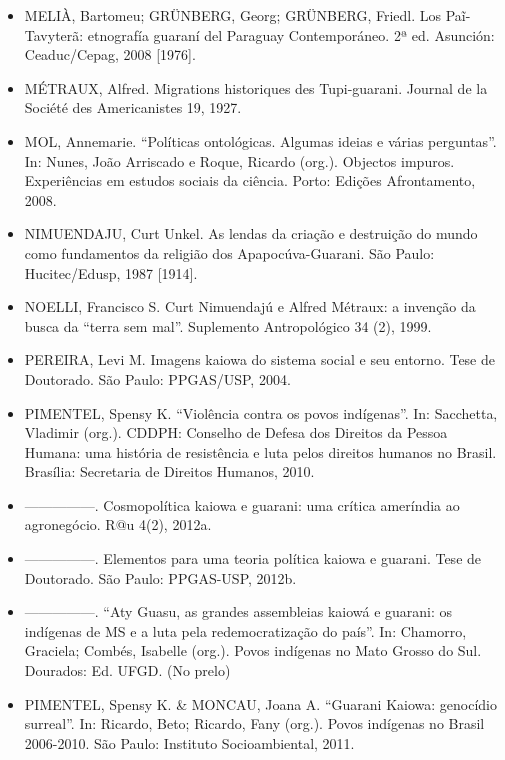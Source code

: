 \begin{itemize}
\item MELIÀ, Bartomeu; GRÜNBERG, Georg; GRÜNBERG, Friedl. Los
Paĩ{}-Tavyterã: etnografía guaraní del Paraguay Contemporáneo. 2ª
ed. Asunción: Ceaduc/Cepag, 2008 [1976].

\item MÉTRAUX, Alfred. Migrations historiques des Tupi-guarani. Journal
de la Société des Americanistes 19, 1927.

\item MOL, Annemarie. ``Políticas ontológicas. Algumas ideias e várias
perguntas''. In: Nunes, João Arriscado e Roque, Ricardo (org.). Objectos
impuros. Experiências em estudos sociais da ciência. Porto: Edições
Afrontamento, 2008.

\item NIMUENDAJU, Curt Unkel. As lendas da criação e destruição do mundo
como fundamentos da religião dos Apapocúva-Guarani. São Paulo:
Hucitec/Edusp, 1987 [1914].

\item NOELLI, Francisco S. Curt Nimuendajú e Alfred Métraux: a invenção
da busca da ``terra sem mal''. Suplemento Antropológico 34 (2), 1999. 

\item PEREIRA, Levi M. Imagens kaiowa do sistema social e seu entorno.
Tese de Doutorado. São Paulo: PPGAS/USP, 2004.

\item PIMENTEL, Spensy K. ``Violência contra os povos indígenas''. In:
Sacchetta, Vladimir (org.). CDDPH: Conselho de Defesa dos Direitos da
Pessoa Humana: uma história de resistência e luta pelos direitos
humanos no Brasil. Brasília: Secretaria de Direitos Humanos, 2010.

\item —————. Cosmopolítica kaiowa e guarani: uma crítica ameríndia ao
agronegócio. R@u 4(2), 2012a.

\item —————. Elementos para uma teoria política kaiowa e guarani. Tese
de Doutorado. São Paulo: PPGAS-USP, 2012b. 

\item —————. ``Aty Guasu, as grandes assembleias kaiowá e guarani: os
indígenas de MS e a luta pela redemocratização do país''. In: Chamorro,
Graciela; Combés, Isabelle (org.). Povos indígenas no Mato Grosso do
Sul. Dourados: Ed. UFGD. (No prelo)

\item PIMENTEL, Spensy K. \& MONCAU, Joana A. ``Guarani Kaiowa: genocídio
surreal''. In: Ricardo, Beto; Ricardo, Fany (org.). Povos indígenas no
Brasil 2006-2010. São Paulo: Instituto Socioambiental, 2011.


\end{itemize}
